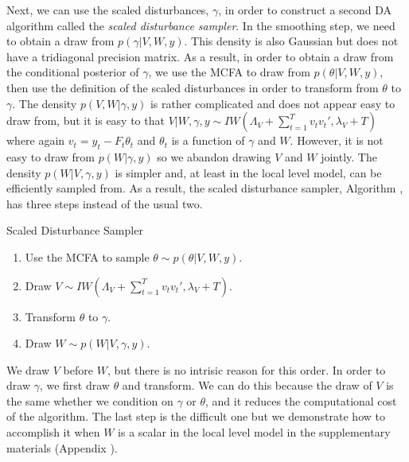 \documentclass[12pt]{article}
\begin{document}
Next, we can use the scaled disturbances, $\gamma$, in order to construct a second DA algorithm called the {\it scaled disturbance sampler}. In the smoothing step, we need to obtain a draw from $p(\gamma|V,W,y)$. This density is also Gaussian but does not have a tridiagonal precision matrix. As a result, in order to obtain a draw from the conditional posterior of $\gamma$, we use the MCFA to draw from $p(\theta|V,W,y)$, then use the definition of the scaled disturbances in order to transform from $\theta$ to $\gamma$. The density $p(V,W|\gamma,y)$ is rather complicated and does not appear easy to draw from, but it is easy to that $V|W,\gamma,y \sim IW\left(\Lambda_V + \sum_{t=1}^Tv_tv_t',\lambda_V + T\right)$ where again $v_t = y_t - F_t\theta_t$ and $\theta_t$ is a function of $\gamma$ and $W$. However, it is not easy to draw from $p(W|\gamma,y)$ so we abandon drawing $V$ and $W$ jointly. The density $p(W|V,\gamma,y)$ is simpler and, at least in the local level model, can be efficiently sampled from. As a result, the scaled disturbance sampler, Algorithm , has three steps instead of the usual two. 
\begin{alg*}[SD]Scaled Disturbance Sampler\label{alg:DLMdist}
\begin{enumerate}
\item Use the MCFA to sample $\theta \sim p(\theta|V,W,y)$.
\item Draw $V \sim IW\left(\Lambda_V + \sum_{t=1}^Tv_tv_t',\lambda_V + T\right)$.
\item Transform $\theta$ to $\gamma$.
\item Draw $W \sim p(W|V,\gamma,y)$.
\end{enumerate}
\end{alg*}\noindent
We draw $V$ before $W$, but there is no intrisic reason for this order. In order to draw $\gamma$, we first draw $\theta$ and transform. We can do this because the draw of $V$ is the same whether we condition on $\gamma$ or $\theta$, and it reduces the computational cost of the algorithm. The last step is the difficult one but we demonstrate how to accomplish it when $W$ is a scalar in the local level model in the supplementary materials (Appendix ).
\end{document}
